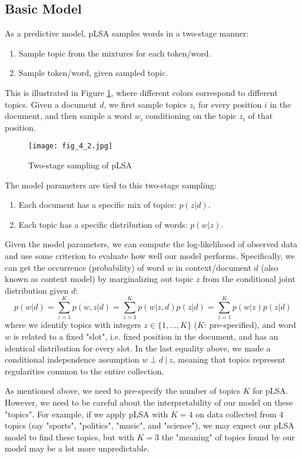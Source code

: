 \documentclass[../book-template.tex]{subfiles}
\begin{document}
\subsection{Basic Model}
As a predictive model, pLSA samples words in a two-stage manner:
\begin{enumerate}
	\item Sample topic from the mixtures for each token/word.
	\item Sample token/word, given sampled topic.
\end{enumerate}
\par This is illustrated in Figure \ref{fig_4_2}, where different colors correspond to different topics. Given a document $d$, we first sample topics $z_i$ for every position $i$ in the document, and then sample a word $w_i$ conditioning on the topic $z_i$ of that position.
\begin{figure}[h] 
	\centering 
	\texttt{[image: fig\_4\_2.jpg]} 
	\caption{Two-stage sampling of pLSA}\label{fig_4_2}
\end{figure}
\par The model parameters are tied to this two-stage sampling:
\begin{enumerate}
	\item Each document has a specific mix of topics: $p(z|d)$.
	\item Each topic has a specific distribution of words: $p(w|z)$.
\end{enumerate}
\par Given the model parameters, we can compute the log-likelihood of observed data and use some criterion to evaluate how well our model performs. Specifically, we can get the occurrence (probability) of word $w$ in context/document $d$ (also known as context model) by marginalizing out topic $z$ from the conditional joint distribution given $d$:
\begin{equation}\label{eq_4_word_prob}
	p(w|d)=\sum_{z=1}^{K}p(w,z|d)=\sum_{z=1}^{K}p(w|z,d)p(z|d) = \sum_{z=1}^{K}p(w|z)p(z|d)
\end{equation}
where we identify topics with integers $z\in \{1,\dots,K\}$ ($K$: pre-specified), and word $w$ is related to a fixed "slot", i.e. fixed position in the document, and has an identical distribution for every slot. In the last equality above, we made a conditional independence assumption $w\perp d\ |\ z$, meaning that topics represent regularities common to the entire collection.
\begin{remark}
	As mentioned above, we need to pre-specify the number of topics $K$ for pLSA. However, we need to be careful about the interpretability of our model on these "topics". For example, if we apply pLSA with $K=4$ on data collected from 4 topics (say "sports", "politics", "music", and "science"), we may expect our pLSA model to find these topics, but with $K=3$ the "meaning" of topics found by our model may be a lot more unpredictable. 
\end{remark}
\end{document}
